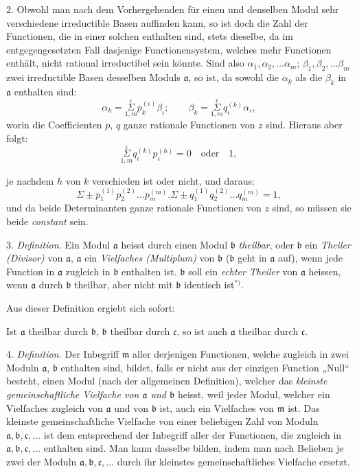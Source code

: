 \documentclass{article}
\begin{document}
2. Obwohl man nach dem Vorhergehenden für einen und denselben Modul sehr verschiedene irreductible Basen auffinden kann, so ist doch die Zahl der Functionen, die in einer solchen enthalten sind, stets dieselbe, da im entgegengesetzten Fall dasjenige Functionensystem, welches mehr Functionen enthält, nicht rational irreductibel sein könnte. Sind also $\alpha_{1}, \alpha_{2}, \ldots \alpha_{m}$; $\beta_{1}, \beta_{2}, \ldots \beta_{m}$ zwei irreductible Basen desselben Moduls $\mathfrak{a}$, so ist, da sowohl die $\alpha_{k}$ als die $\beta_{k}$ in $\mathfrak{a}$ enthalten sind:
\[ \alpha_{k} = \overset{\iota}{\underset{1,m}{\Sigma}} p_{k}^{(\iota)}\beta_{\iota}; \qquad \beta_{k} = \overset{\iota}{\underset{1,m}{\Sigma}} q_{\iota}^{(k)}\alpha_{\iota}, \]
worin die Coefficienten $p$, $q$ ganze rationale Functionen von $z$ sind. Hieraus aber folgt:
\[ \overset{\iota}{\underset{1,m}{\Sigma}} q_{\iota}^{(k)}p_{\iota}^{(h)} = 0 \quad \text{oder} \quad 1, \]

je nachdem $h$ von $k$ verschieden ist oder nicht, und daraus:
\[ \Sigma \pm p_{1}^{(1)}p_{2}^{(2)}\ldots p_{m}^{(m)}.\Sigma \pm q_{1}^{(1)}q_{2}^{(2)}\ldots q_{m}^{(m)} = 1, \]
und da beide Determinanten ganze rationale Functionen von $z$ sind, so müssen sie beide \emph{constant} sein.

3. \emph{Definition.} Ein Modul $\mathfrak{a}$ heisst durch einen Modul $\mathfrak{b}$ \emph{theilbar}, oder $\mathfrak{b}$ ein \emph{Theiler (Divisor)} von $\mathfrak{a}$, $\mathfrak{a}$ ein \emph{Vielfaches (Multiplum)} von $\mathfrak{b}$ ($\mathfrak{b}$ geht in $\mathfrak{a}$ auf), wenn jede Function in $\mathfrak{a}$ zugleich in $\mathfrak{b}$ enthalten ist. $\mathfrak{b}$ soll ein \emph{echter Theiler} von $\mathfrak{a}$ heissen, wenn $\mathfrak{a}$ durch $\mathfrak{b}$ theilbar, aber nicht mit $\mathfrak{b}$ identisch ist${}^{*)}$.

Aus dieser Definition ergiebt sich sofort:

Ist $\mathfrak{a}$ theilbar durch $\mathfrak{b}$, $\mathfrak{b}$ theilbar durch $\mathfrak{c}$, so ist auch $\mathfrak{a}$ theilbar durch $\mathfrak{c}$.

4. \emph{Definition.} Der Inbegriff $\mathfrak{m}$ aller derjenigen Functionen, welche zugleich in zwei Moduln $\mathfrak{a}$, $\mathfrak{b}$ enthalten sind, bildet, falls er nicht aus der einzigen Function „Null“ besteht, einen Modul (nach der allgemeinen Definition), welcher das \emph{kleinste gemeinschaftliche Vielfache von $\mathfrak{a}$ und $\mathfrak{b}$} heisst, weil jeder Modul, welcher ein Vielfaches zugleich von $\mathfrak{a}$ und von $\mathfrak{b}$ ist, auch ein Vielfaches von $\mathfrak{m}$ ist. Das kleinste gemeinschaftliche Vielfache von einer beliebigen Zahl von Moduln $\mathfrak{a}, \mathfrak{b}, \mathfrak{c}, \ldots$ ist dem entsprechend der Inbegriff aller der Functionen, die zugleich in $\mathfrak{a}, \mathfrak{b}, \mathfrak{c}, \ldots$ enthalten sind. Man kann dasselbe bilden, indem man nach Belieben je zwei der Moduln $\mathfrak{a}, \mathfrak{b}, \mathfrak{c}, \ldots$ durch ihr kleinstes gemeinschaftliches Vielfache ersetzt.
\end{document}
